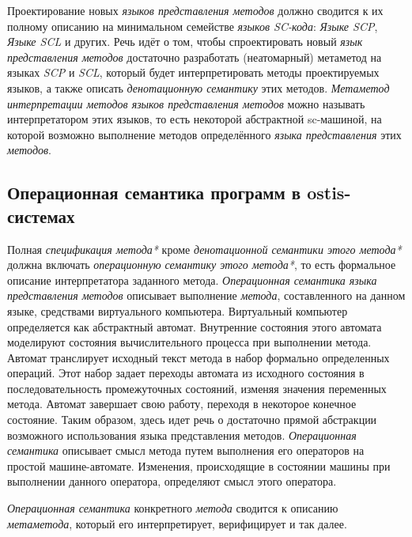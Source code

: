 \begin{textitemize}
    \item Проектирование новых \textit{языков представления методов} должно сводится к их полному описанию на минимальном семействе \textit{языков SC-кода}: \textit{Языке SCP}, \textit{Языке SCL} и других. Речь идёт о том, чтобы спроектировать новый \textit{язык представления методов} достаточно разработать (неатомарный) метаметод на языках \textit{SCP} и \textit{SCL}, который будет интерпретировать методы проектируемых языков, а также описать \textit{денотационную семантику} этих методов. \textit{Метаметод интерпретации методов языков представления методов} можно называть интерпретатором этих языков, то есть некоторой абстрактной sc-машиной, на которой возможно выполнение методов определённого \textit{языка представления} этих \textit{методов}.
\end{textitemize}

\subsection{Операционная семантика программ в ostis-системах}
\label{sec_programs_method_op_semantic}

Полная \textit{спецификация метода*} кроме \textit{денотационной семантики этого метода*} должна включать \textit{операционную семантику этого метода*}, то есть формальное описание интерпретатора заданного метода. \textit{Операционная семантика языка представления методов} описывает выполнение \textit{метода}, составленного на данном языке, средствами виртуального компьютера. Виртуальный компьютер определяется как абстрактный автомат. Внутренние состояния этого автомата моделируют состояния вычислительного процесса при выполнении метода. Автомат транслирует исходный текст метода в набор формально определенных операций. Этот набор задает переходы автомата из исходного состояния в последовательность промежуточных состояний, изменяя значения переменных метода. Автомат завершает свою работу, переходя в некоторое конечное состояние. Таким образом, здесь идет речь о достаточно прямой абстракции возможного использования языка представления методов. \textit{Операционная семантика} описывает смысл метода путем выполнения его операторов на простой машине-автомате. Изменения, происходящие в состоянии машины при выполнении данного оператора, определяют смысл этого оператора.

\textit{Операционная семантика} конкретного \textit{метода} сводится к описанию \textit{метаметода}, который его интерпретирует, верифицирует и так далее.

